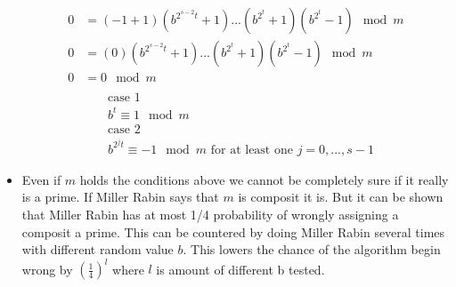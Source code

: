 \begin{itemize}
\begin{align*}
0&=(-1+1)(b^{2^{s-2}t}+1)...(b^{2^t}+1)(b^{2^t}-1)\mod m\\
0&=(0)(b^{2^{s-2}t}+1)...(b^{2^t}+1)(b^{2^t}-1)\mod m\\
0&=0\mod m\\
\end{align*}
\begin{align*}
&\mbox{case 1}\\
&b^t \equiv 1 \mod m\\
&\mbox{case 2}\\
&b^{2^{j}t} \equiv -1 \mod m \mbox{ for at least one $j=0,...,s-1$}
\end{align*}
\item Even if $m$ holds the conditions above we cannot be completely sure if it really is a prime. If Miller Rabin says that $m$ is composit it is. But it can be shown that Miller Rabin has at most 1/4 probability of wrongly assigning a composit a prime. This can be countered by doing Miller Rabin several times with different random value $b$. This lowers the chance of the algorithm begin wrong by $(\frac{1}{4})^l$ where $l$ is amount of different b tested.
\end{itemize}
